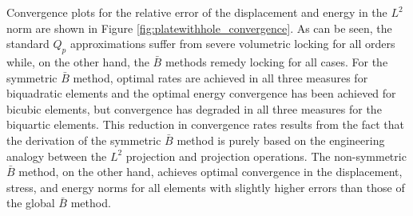 Convergence plots for the relative error of the displacement and energy in the $L^2$ norm are shown in Figure \ref{fig:platewithhole_convergence}. As can be seen, the standard $Q_p$ approximations suffer from severe volumetric locking for all orders while, on the other hand, the $\bar{B}$ methods remedy locking for all cases. {For the symmetric \Bezier $\bar{B}$ method, optimal rates are achieved in all three measures for biquadratic elements and the optimal energy convergence has been achieved for bicubic elements, but convergence has degraded in all three measures for the biquartic elements. This reduction in convergence rates results from the fact that the derivation of the symmetric \Bezier $\bar{B}$ method is purely based on the engineering analogy between the $L^2$ projection and \Bezier projection operations. The non-symmetric \Bezier $\bar{B}$ method, on the other hand, achieves optimal convergence in the displacement, stress, and energy norms for all elements with slightly higher errors than those of the global $\bar{B}$ method.}

